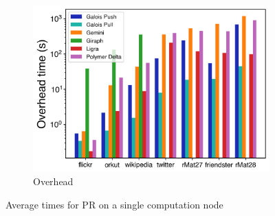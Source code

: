 \documentclass{meetings}
\begin{document}
\begin{figure}
\begin{subfigure}{0.32\textwidth}
		\includegraphics[width=\linewidth]{../../plots/singleNodePR_overheadTIme.png}
		\caption{Overhead}
		\label{fig:singleNodePR_overhead}
	\end{subfigure}
	\hfil
	\caption{Average times for PR on a single computation node}
	\label{fig:singleNodePR}
\end{figure}
\end{document}
